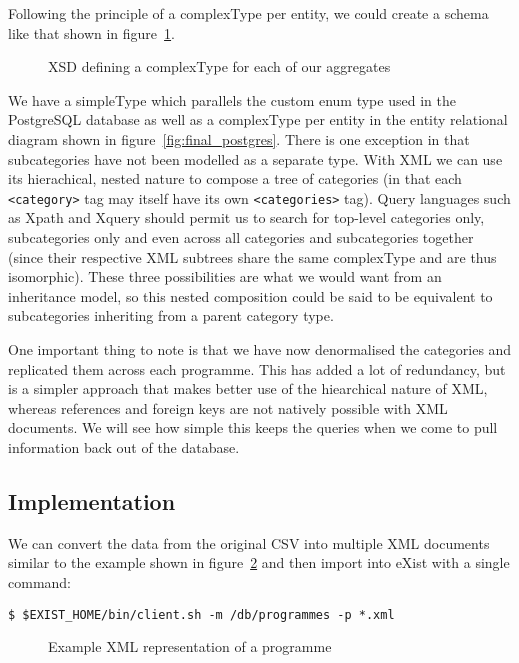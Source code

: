 \documentclass[11pt,a4paper]{article}
\begin{document}
Following the principle of a complexType per entity, we could create
a schema like that shown in figure~\ref{fig:xsd}.

\begin{figure}[p]
  
  \caption{XSD defining a complexType for each of our aggregates}
  \label{fig:xsd}
\end{figure}

We have a simpleType which parallels the custom enum type used in the
PostgreSQL database as well as a complexType per entity in the entity
relational diagram shown in figure~\ref{fig:final_postgres}. There is one
exception in that subcategories have not been modelled as a separate
type. With XML we can use its hierachical, nested nature to compose
a tree of categories (in that each \lstinline|<category>| tag may
itself have its own \lstinline|<categories>| tag). Query languages such
as Xpath and Xquery should permit us to search for top-level categories
only, subcategories only and even across all categories and subcategories
together (since their respective XML subtrees share the same complexType and
are thus isomorphic). These three possibilities are what we would want
from an inheritance model, so this nested composition could be said
to be equivalent to subcategories inheriting from a parent category type.

One important thing to note is that we have now denormalised the
categories and replicated them across each programme. This has
added a lot of redundancy, but is a simpler approach that makes better
use of the hiearchical nature of XML, whereas references and foreign
keys are not natively possible with XML documents. We will see how
simple this keeps the queries when we come to pull information back
out of the database.

\subsection{Implementation}

We can convert the data from the original CSV into multiple XML documents
similar to the example shown in figure~\ref{fig:xml-example} and then import
into eXist with a single command:

\begin{lstlisting}
$ $EXIST_HOME/bin/client.sh -m /db/programmes -p *.xml
\end{lstlisting}

\begin{figure}[p]
  
  \caption{Example XML representation of a programme}
  \label{fig:xml-example}
\end{figure}
\end{document}
